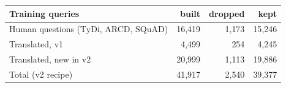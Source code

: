 \begin{tabular}{@{}lrrr@{}}
\toprule
Training queries & built & dropped & kept \\
\midrule
Human questions (TyDi, ARCD, SQuAD) & 16{,}419 & 1{,}173 & 15{,}246 \\
Translated, v1 & 4{,}499 & 254 & 4{,}245 \\
Translated, new in v2 & 20{,}999 & 1{,}113 & 19{,}886 \\
\midrule
Total (v2 recipe) & 41{,}917 & 2{,}540 & 39{,}377 \\
\bottomrule
\end{tabular}
